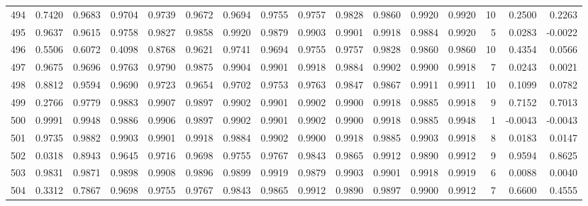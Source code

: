 \begin{tabular}{lrrrrrrrrrrrrrrr}
494 &      0.7420 &  0.9683 &  0.9704 &  0.9739 &  0.9672 &  0.9694 &  0.9755 &  0.9757 &  0.9828 &  0.9860 &   0.9920 &     0.9920 &     10 &                    0.2500 &                     0.2263 \\
495 &      0.9637 &  0.9615 &  0.9758 &  0.9827 &  0.9858 &  0.9920 &  0.9879 &  0.9903 &  0.9901 &  0.9918 &   0.9884 &     0.9920 &      5 &                    0.0283 &                    -0.0022 \\
496 &      0.5506 &  0.6072 &  0.4098 &  0.8768 &  0.9621 &  0.9741 &  0.9694 &  0.9755 &  0.9757 &  0.9828 &   0.9860 &     0.9860 &     10 &                    0.4354 &                     0.0566 \\
497 &      0.9675 &  0.9696 &  0.9763 &  0.9790 &  0.9875 &  0.9904 &  0.9901 &  0.9918 &  0.9884 &  0.9902 &   0.9900 &     0.9918 &      7 &                    0.0243 &                     0.0021 \\
498 &      0.8812 &  0.9594 &  0.9690 &  0.9723 &  0.9654 &  0.9702 &  0.9753 &  0.9763 &  0.9847 &  0.9867 &   0.9911 &     0.9911 &     10 &                    0.1099 &                     0.0782 \\
499 &      0.2766 &  0.9779 &  0.9883 &  0.9907 &  0.9897 &  0.9902 &  0.9901 &  0.9902 &  0.9900 &  0.9918 &   0.9885 &     0.9918 &      9 &                    0.7152 &                     0.7013 \\
500 &      0.9991 &  0.9948 &  0.9886 &  0.9906 &  0.9897 &  0.9902 &  0.9901 &  0.9902 &  0.9900 &  0.9918 &   0.9885 &     0.9948 &      1 &                   -0.0043 &                    -0.0043 \\
501 &      0.9735 &  0.9882 &  0.9903 &  0.9901 &  0.9918 &  0.9884 &  0.9902 &  0.9900 &  0.9918 &  0.9885 &   0.9903 &     0.9918 &      8 &                    0.0183 &                     0.0147 \\
502 &      0.0318 &  0.8943 &  0.9645 &  0.9716 &  0.9698 &  0.9755 &  0.9767 &  0.9843 &  0.9865 &  0.9912 &   0.9890 &     0.9912 &      9 &                    0.9594 &                     0.8625 \\
503 &      0.9831 &  0.9871 &  0.9898 &  0.9908 &  0.9896 &  0.9899 &  0.9919 &  0.9879 &  0.9903 &  0.9901 &   0.9918 &     0.9919 &      6 &                    0.0088 &                     0.0040 \\
504 &      0.3312 &  0.7867 &  0.9698 &  0.9755 &  0.9767 &  0.9843 &  0.9865 &  0.9912 &  0.9890 &  0.9897 &   0.9900 &     0.9912 &      7 &                    0.6600 &                     0.4555 \\

\end{tabular}
